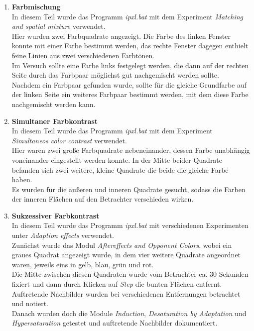 \documentclass[11pt]{article}
\newcommand{\RM}[1]{\MakeUppercase{\romannumeral #1{}}}
\begin{document}
\begin{enumerate}
\item \textbf{Farbmischung \RM{2}} \\
In diesem Teil wurde das Programm \textit{ipxl.bat} mit dem Experiment \textit{Matching and spatial mixture} verwendet. \\
Hier wurden zwei Farbquadrate angezeigt. Die Farbe des linken Fenster konnte mit einer Farbe bestimmt werden, das rechte Fenster dagegen enthielt feine Linien aus zwei verschiedenen Farbtönen. \\
Im Versuch sollte eine Farbe links festgelegt werden, die dann auf der rechten Seite durch das Farbpaar möglichst gut nachgemischt werden sollte. \\
Nachdem ein Farbpaar gefunden wurde, sollte für die gleiche Grundfarbe auf der linken Seite ein weiteres Farbpaar bestimmt werden, mit dem diese Farbe nachgemischt werden kann. 

\item \textbf{Simultaner Farbkontrast } \\
In diesem Teil wurde das Programm \textit{ipxl.bat} mit dem Experiment \textit{Simultaneos color contrast} verwendet. \\
Hier waren zwei große Farbquadrate nebeneinander, dessen Farbe unabhängig voneinander eingestellt werden konnte. In der Mitte beider Quadrate befanden sich zwei weitere, kleine Quadrate die beide die gleiche Farbe haben. \\
Es wurden für die äußeren und inneren Quadrate gesucht, sodass die Farben der inneren Flächen auf den Betrachter verschieden wirken. 

\item \textbf{Sukzessiver Farbkontrast } \\
In diesem Teil wurde das Programm \textit{ipxl.bat} mit verschiedenen Experimenten unter \textit{Adaption effects} verwendet. \\
Zunächst wurde das Modul \textit{Aftereffects and Opponent Colors}, wobei ein graues Quadrat angezeigt wurde, in dem vier weitere Quadrate angeordnet waren, jeweils eins in gelb, blau, grün und rot. \\
Die Mitte zwischen diesen Quadraten wurde vom Betrachter ca. 30 Sekunden fixiert und dann durch Klicken auf \textit{Step} die bunten Flächen entfernt. Auftretende Nachbilder wurden bei verschiedenen Entfernungen betrachtet und notiert. \\
Danach wurden doch die Module \textit{Induction}, \textit{Desaturation by Adaptation} und \textit{Hypersaturation} getestet und auftretende Nachbilder dokumentiert. 

\end{enumerate}
\end{document}
